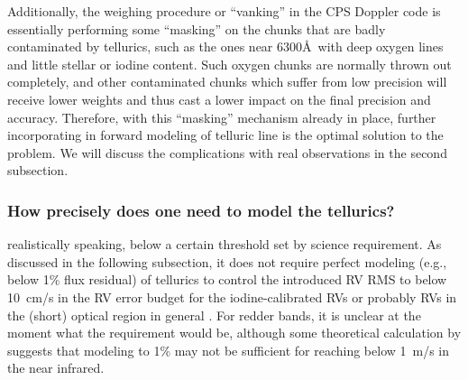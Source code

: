 Additionally, the weighing procedure or ``vanking'' in the CPS Doppler
code is essentially performing some ``masking'' on the chunks that are
badly contaminated by tellurics, such as the ones near 6300\AA\ with
deep oxygen lines and little stellar or iodine content. Such oxygen
chunks are normally thrown out completely, and other contaminated
chunks which suffer from low precision will receive lower weights and
thus cast a lower impact on the final precision and
accuracy. Therefore, with this ``masking'' mechanism already in place,
further incorporating in forward modeling of telluric line is the
optimal solution to the problem. We will discuss the complications
with real observations in the second subsection.


\subsubsection{How precisely does one need to model the tellurics?}

realistically
speaking, below a certain threshold set by science requirement. As
discussed in the following subsection, it does not require perfect
modeling (e.g., below 1\% flux residual) of tellurics to control the
introduced RV RMS to below 10~cm/s in the RV error budget for the
iodine-calibrated RVs or probably RVs in the (short) optical region in
general \citep{cunha2014, artigau2014}. For redder bands, it is
unclear at the moment what the requirement would be, although some
theoretical calculation by \cite{2016AAS...22713719S} suggests that
modeling to 1\% may not be sufficient for reaching below 1~m/s in the
near infrared.

